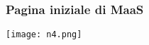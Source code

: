 \begin{frame}
  \frametitle{Pagina iniziale di MaaS}
  \centering
  \texttt{[image: n4.png]}\\
\end{frame}


